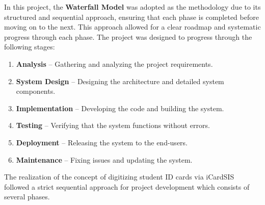 \documentclass[a4paper,14pt]{article}
\begin{document}
{{{{{{{\begin{itemize}
			\end{itemize}
		\vspace{0.5cm}
		{
			\noindent \normalsize
			\justifying In this project, the \textbf{Waterfall Model} was adopted as the methodology due to its structured and sequential approach, ensuring that each phase is completed before moving on to the next. This approach allowed for a clear roadmap and systematic progress through each phase. The project was designed to progress through the following stages:
			
			\begin{enumerate}
				\item \textbf{Analysis} – Gathering and analyzing the project requirements.
				\item \textbf{System Design} – Designing the architecture and detailed system components.
				\item \textbf{Implementation} – Developing the code and building the system.
				\item \textbf{Testing} – Verifying that the system functions without errors.
				\item \textbf{Deployment} – Releasing the system to the end-users.
				\item \textbf{Maintenance} – Fixing issues and updating the system.
			\end{enumerate}
			
		\vspace{0.5cm}
		
		\newpage
		
		\vspace{0.5cm}
		{
			\noindent \normalsize
			\justifying The realization of the concept of digitizing student ID cards via iCardSIS followed a strict
			sequential approach for project development which consists of several phases.
		
}}}}}}}}}
\end{document}
